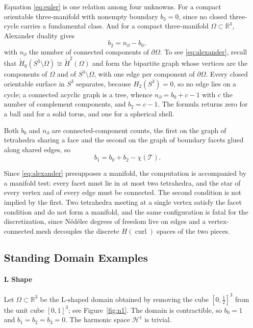 \documentclass{article}
\begin{document}
Equation \eqref{eq:euler} is one relation among four unknowns. For a
compact orientable three-manifold with nonempty boundary $b_{3}=0$,
since no closed three-cycle carries a fundamental class. And for a
compact three-manifold $\Omega\subset\mathbb{R}^{3}$, Alexander duality
gives
\begin{equation}\label{eq:alexander}
  b_{2}=n_{\partial}-b_{0},
\end{equation}
with $n_{\partial}$ the number of connected components of
$\partial\Omega$. To see \eqref{eq:alexander}, recall that
$\tilde H_{0}(S^{3}\setminus\Omega)\cong\tilde H^{2}(\Omega)$ and form
the bipartite graph whose vertices are the components of $\Omega$ and
of $S^{3}\setminus\Omega$, with one edge per component of
$\partial\Omega$. Every closed orientable surface in $S^{3}$ separates,
because $H_{2}(S^{3})=0$, so no edge lies on a cycle; a connected
acyclic graph is a tree, whence $n_{\partial}=b_{0}+c-1$ with $c$ the
number of complement components, and $b_{2}=c-1$. The formula returns
zero for a ball and for a solid torus, and one for a spherical shell.
 
Both $b_{0}$ and $n_{\partial}$ are connected-component counts, the
first on the graph of tetrahedra sharing a face and the second on the
graph of boundary facets glued along shared edges, so
\[
  b_{1}=b_{0}+b_{2}-\chi(\mathcal{T}).
\]
 
Since \eqref{eq:alexander} presupposes a manifold, the computation is
accompanied by a manifold test: every facet must lie in at most two
tetrahedra, and the star of every vertex and of every edge must be
connected. The second condition is not implied by the first. Two
tetrahedra meeting at a single vertex satisfy the facet condition and
do not form a manifold, and the same configuration is fatal for the
discretization, since N\'ed\'elec degrees of freedom live on edges and
a vertex-connected mesh decouples the discrete
$H(\operatorname{curl})$ spaces of the two pieces.
\subsection{Standing Domain Examples}

 \paragraph{L Shape}\label{ex:lshape}
Let $\Omega\subset\mathbb{R}^{3}$ be the L-shaped domain obtained by
removing the cube $[0,\tfrac12]^{3}$ from the unit cube $[0,1]^{3}$;
see Figure~\ref{fig:n1}. The domain is contractible, so
$b_{0}=1$ and $b_{1}=b_{2}=b_{3}=0$. The harmonic space
$\mathcal{H}^{1}$ is trivial.
\end{document}
